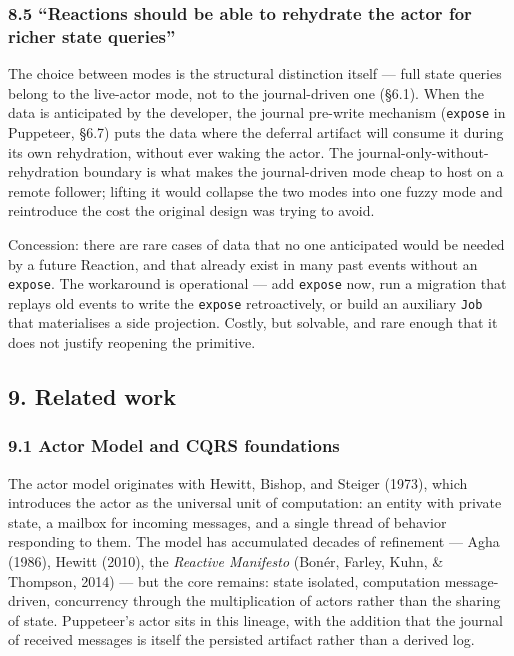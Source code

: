 \documentclass[
]{article}
\let\origtexttt\texttt%
\renewcommand{\texttt}[1]{\origtexttt{\seqsplit{#1}}}%
\let\texttt\origtexttt%
\begin{document}
\subsubsection{8.5 ``Reactions should be able to rehydrate the actor for
richer state
queries''}\label{reactions-should-be-able-to-rehydrate-the-actor-for-richer-state-queries}

The choice between modes is the structural distinction itself --- full
state queries belong to the live-actor mode, not to the journal-driven
one (§6.1). When the data is anticipated by the developer, the journal
pre-write mechanism (\texttt{expose} in Puppeteer, §6.7) puts the data
where the deferral artifact will consume it during its own rehydration,
without ever waking the actor. The journal-only-without-rehydration
boundary is what makes the journal-driven mode cheap to host on a remote
follower; lifting it would collapse the two modes into one fuzzy mode
and reintroduce the cost the original design was trying to avoid.

Concession: there are rare cases of data that no one anticipated would
be needed by a future Reaction, and that already exist in many past
events without an \texttt{expose}. The workaround is operational --- add
\texttt{expose} now, run a migration that replays old events to write
the \texttt{expose} retroactively, or build an auxiliary \texttt{Job}
that materialises a side projection. Costly, but solvable, and rare
enough that it does not justify reopening the primitive.

\subsection{9. Related work}\label{related-work}

\subsubsection{9.1 Actor Model and CQRS
foundations}\label{actor-model-and-cqrs-foundations}

The actor model originates with Hewitt, Bishop, and Steiger (1973),
which introduces the actor as the universal unit of computation: an
entity with private state, a mailbox for incoming messages, and a single
thread of behavior responding to them. The model has accumulated decades
of refinement --- Agha (1986), Hewitt (2010), the \emph{Reactive
Manifesto} (Bonér, Farley, Kuhn, \& Thompson, 2014) --- but the core
remains: state isolated, computation message-driven, concurrency through
the multiplication of actors rather than the sharing of state.
Puppeteer's actor sits in this lineage, with the addition that the
journal of received messages is itself the persisted artifact rather
than a derived log.
\end{document}
